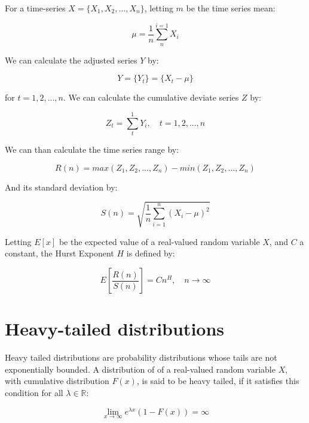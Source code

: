 For a time-series $X = \{ X_1, X_2, ..., X_n \}$, letting $m$ be the time series mean:

\begin{equation}
\mu = \frac{1}{n}\sum_{n}^{i=1}X_i
\end{equation}


We can calculate the adjusted series $Y$ by:

\begin{equation}
Y = \{ Y_t \} = \{ X_t - \mu \}
\end{equation}

for $t = 1, 2, ..., n $. We can calculate the  cumulative deviate series $Z$ by:


\begin{equation}
Z_t = \sum_{t}^{1}Y_i, \quad t = 1, 2, ..., n 
\end{equation}

We can than calculate the time series range by:

\begin{equation}
R(n) = max(Z_1, Z_2, ..., Z_n) - min(Z_1, Z_2, ..., Z_n)
\end{equation}

And its standard deviation by:

\begin{equation}
S(n) = \sqrt{\frac{1}{n}\sum_{i=1}^{n}(X_i -  \mu)^{2}}
\end{equation}


Letting $E[x]$ be the expected value of a real-valued random variable  $X$, and $C$ a constant, the Hurst Exponent $H$ is defined by\cite{hurst-def}:

\begin{equation}
E\left [  \frac{R(n)}{S(n)} \right ] = Cn^{H}, \quad n \to \infty 
\end{equation}



\section{Heavy-tailed distributions}

Heavy tailed distributions are probability distributions whose tails are not exponentially bounded.  A distribution of of a real-valued random variable $X$, with cumulative distribution $F(x)$, is said to be heavy tailed, if it satisfies this condition for all $\lambda \in \mathbb{R}$:

\begin{equation}
	\lim_{x\to\infty} e^{\lambda x} (1 - F(x)) = \infty
\end{equation}



